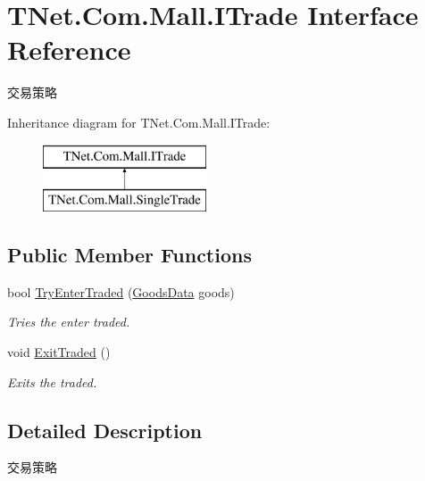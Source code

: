 \hypertarget{interface_t_net_1_1_com_1_1_mall_1_1_i_trade}{}\section{T\+Net.\+Com.\+Mall.\+I\+Trade Interface Reference}
\label{interface_t_net_1_1_com_1_1_mall_1_1_i_trade}


交易策略  


Inheritance diagram for T\+Net.\+Com.\+Mall.\+I\+Trade\+:\begin{figure}[H]
\begin{center}
\leavevmode
\includegraphics[height=2.000000cm]{interface_t_net_1_1_com_1_1_mall_1_1_i_trade}
\end{center}
\end{figure}
\subsection*{Public Member Functions}
\begin{DoxyCompactItemize}
\item 
bool \mbox{\hyperlink{interface_t_net_1_1_com_1_1_mall_1_1_i_trade_a3812ebe5aec424adfe8556739290149a}{Try\+Enter\+Traded}} (\mbox{\hyperlink{class_t_net_1_1_com_1_1_model_1_1_goods_data}{Goods\+Data}} goods)
\begin{DoxyCompactList}\small\item\em Tries the enter traded. \end{DoxyCompactList}\item 
void \mbox{\hyperlink{interface_t_net_1_1_com_1_1_mall_1_1_i_trade_acdc77a56a409b403d8bad022031c8bbf}{Exit\+Traded}} ()
\begin{DoxyCompactList}\small\item\em Exits the traded. \end{DoxyCompactList}\end{DoxyCompactItemize}


\subsection{Detailed Description}
交易策略 



